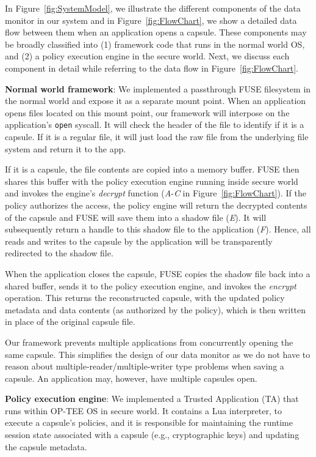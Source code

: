 In Figure~\ref{fig:SystemModel}, we illustrate the different components of the
data monitor in our system and in Figure~\ref{fig:FlowChart}, we show a detailed
data flow between them when an application opens a capsule. These components may
be broadly classified into (1) framework code that runs in the normal world OS,
and (2) a policy execution engine in the secure world. Next, we discuss
each component in detail while referring to the data flow in
Figure~\ref{fig:FlowChart}.

{\bf Normal world framework}: We implemented a passthrough FUSE filesystem in
the normal world and expose it as a separate mount point. When an application
opens files located on this mount point, our framework will interpose on the
application's {\tt open} syscall. It will check the header of the file to
identify if it is a capsule. If it is a regular file, it will just load the raw
file from the underlying file system and return it to the app.

If it is a capsule, the file contents are copied into a memory buffer. FUSE then
shares this buffer with the policy execution engine running inside secure world
and invokes the engine's {\em decrypt} function ({\em A}-{\em C} in
Figure~\ref{fig:FlowChart}). If the policy authorizes the access, the policy
engine will return the decrypted contents of the capsule and FUSE will save them
into a shadow file ({\em E}). It will subsequently return a handle to this
shadow file to the application ({\em F}). Hence, all reads and writes to the
capsule by the application will be transparently redirected to the shadow file.

When the application closes the capsule, FUSE copies the shadow file back into a
shared buffer, sends it to the policy execution engine, and invokes the {\em encrypt}
operation. This returns the reconstructed capsule, with the updated policy
metadata and data contents (as authorized by the policy), which is then written
in place of the original capsule file.

Our framework prevents multiple applications from concurrently opening the same
capsule. This simplifies the design of our data monitor as we do not have to
reason about multiple-reader/multiple-writer type problems when saving a
capsule. An application may, however, have multiple capsules open.

    {\bf Policy execution engine}: We implemented a Trusted Application (TA) that
runs within OP-TEE OS in secure world. It contains a Lua interpreter, to execute
a capsule's policies, and it is responsible for maintaining the runtime session
state associated with a capsule (e.g., cryptographic keys) and updating the
capsule metadata.

